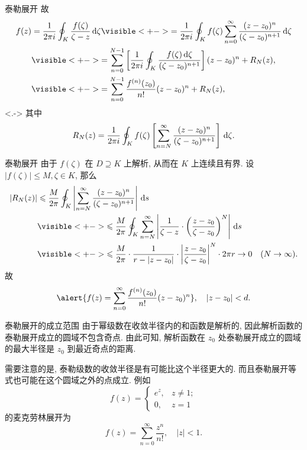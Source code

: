 \begin{frame}{泰勒展开}
\onslide<+->
故
\begin{align*}
f(z)&=\frac1{2\pi i}\oint_K \frac{f(\zeta)}{\zeta-z}\diff\zeta
\visible<+->{=\frac1{2\pi i}\oint_K f(\zeta)\sum_{n=0}^\infty\frac{(z-z_0)^n}{(\zeta-z_0)^{n+1}}\diff\zeta}\\
&\visible<+->{=
\sum_{n=0}^{N-1}\left[\frac1{2\pi i}\oint_K\frac{f(\zeta)\diff\zeta}{(\zeta-z_0)^{n+1}}\right](z-z_0)^n+R_N(z),}\\
&\visible<+->{=
\sum_{n=0}^{N-1}\frac{f^{(n)}(z_0)}{n!}(z-z_0)^n+R_N(z),}
\end{align*}
\onslide<.->
其中
\[R_N(z)=\frac1{2\pi i}\oint_Kf(\zeta)\left[\sum_{n=N}^\infty\frac{(z-z_0)^n}{(\zeta-z_0)^{n+1}}\right]\,\mathrm{d}\zeta.\]
\end{frame}


\begin{frame}{泰勒展开}
\onslide<+->
由于 $f(\zeta)$ 在 $D\supseteq K$ 上解析, 从而在 $K$ 上连续且有界.
\onslide<+->
设 $|f(\zeta)|\le M,\zeta\in K$,
\onslide<+->
那么
\begin{align*}
|R_N(z)|&\le\frac M{2\pi}\oint_K\abs{\sum_{n=N}^\infty\frac{(z-z_0)^n}{(\zeta-z_0)^{n+1}}}\diff s\\
&\visible<+->{\le\frac M{2\pi}\oint_K\sum_{n=N}^\infty\abs{\frac1{\zeta-z}\cdot\left(\frac{z-z_0}{\zeta-z_0}\right)^N}\diff s}\\
&\visible<+->{\le\frac M{2\pi}\cdot\frac1{r-|z-z_0|}\cdot\abs{\frac{z-z_0}{\zeta-z_0}}^N\cdot 2\pi r\to 0\quad (N\to\infty).}
\end{align*}
\onslide<+->
故
\[\alert{f(z)=\sum_{n=0}^\infty\frac{f^{(n)}(z_0)}{n!}(z-z_0)^n},\quad
|z-z_0|<d.\]
\end{frame}


\begin{frame}{泰勒展开的成立范围}
\onslide<+->
由于幂级数在收敛半径内的和函数是解析的, 因此解析函数的泰勒展开成立的圆域不包含奇点.
\onslide<+->
由此可知, 解析函数在 $z_0$ 处\alert{泰勒展开成立的圆域的最大半径是 $z_0$ 到最近奇点的距离}.

\onslide<+->
需要注意的是, 泰勒级数的收敛半径是有可能比这个半径更大的.
\onslide<+->
而且泰勒展开等式也可能在这个圆域之外的点成立.
\onslide<+->
例如 
\[f(z)=\begin{cases}
e^z,&z\neq 1;\\ 0,&z=1
\end{cases}\]
的麦克劳林展开为
\[f(z)=\sum_{n=0}^\infty \frac{z^n}{n!},\quad |z|<1.\]
\end{frame}


